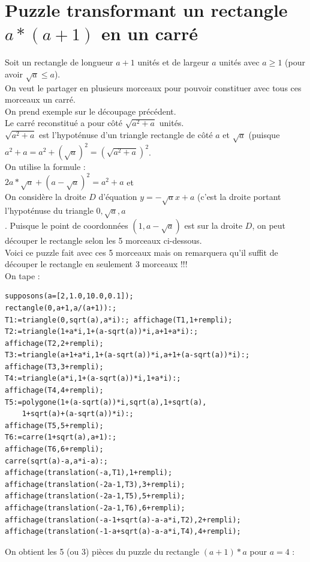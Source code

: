 \documentclass[a4paper,11pt]{book}
\begin{document}
\section{Puzzle transformant un rectangle $a*(a+1)$ en un carr\'e}
Soit un rectangle de longueur $a+1$ unit\'es et de largeur $a$ unit\'es avec 
$a\geq 1$ (pour avoir $\sqrt a \leq a$).\\
On veut le partager en plusieurs morceaux pour pouvoir constituer avec 
tous ces morceaux un carr\'e.\\
On prend exemple sur le d\'ecoupage pr\'ec\'edent.\\
Le carr\'e reconstitu\'e a pour c\^ot\'e $\sqrt{a^2+a}$ unit\'es.\\
$\sqrt{a^2+a}$ est l'hypot\'enuse d'un triangle rectangle de c\^ot\'e $a$ et 
$\sqrt a$ (puisque $a^2+a=a^2+(\sqrt a)^2=(\sqrt {a^2+a})^2$.\\
On utilise la formule :\\
$2a*\sqrt a+(a-\sqrt a)^2=a^2+a$ et\\
On consid\`ere la droite $D$ d'\'equation $y=-\sqrt ax+a$ (c'est la droite
portant l'hypot\'enuse du triangle $0,\sqrt a,a$\\.
Puisque le point de coordonn\'ees $(1,a-\sqrt a)$ est sur la droite $D$, on 
peut d\'ecouper le rectangle selon les 5 morceaux ci-dessous.\\
Voici ce puzzle fait avec ces 5 morceaux mais on remarquera qu'il suffit de 
d\'ecouper le rectangle en seulement 3 morceaux !!!\\
On tape :
\begin{verbatim}
supposons(a=[2,1.0,10.0,0.1]);
rectangle(0,a+1,a/(a+1)):;
T1:=triangle(0,sqrt(a),a*i):; affichage(T1,1+rempli);
T2:=triangle(1+a*i,1+(a-sqrt(a))*i,a+1+a*i):; 
affichage(T2,2+rempli);
T3:=triangle(a+1+a*i,1+(a-sqrt(a))*i,a+1+(a-sqrt(a))*i):; 
affichage(T3,3+rempli);
T4:=triangle(a*i,1+(a-sqrt(a))*i,1+a*i):; 
affichage(T4,4+rempli);
T5:=polygone(1+(a-sqrt(a))*i,sqrt(a),1+sqrt(a),
    1+sqrt(a)+(a-sqrt(a))*i):; 
affichage(T5,5+rempli);
T6:=carre(1+sqrt(a),a+1):;
affichage(T6,6+rempli);
carre(sqrt(a)-a,a*i-a):;
affichage(translation(-a,T1),1+rempli);
affichage(translation(-2a-1,T3),3+rempli);
affichage(translation(-2a-1,T5),5+rempli);
affichage(translation(-2a-1,T6),6+rempli);
affichage(translation(-a-1+sqrt(a)-a-a*i,T2),2+rempli);
affichage(translation(-1-a+sqrt(a)-a-a*i,T4),4+rempli);
\end{verbatim}
On obtient les 5 (ou 3) pi\`eces du puzzle du rectangle $(a+1)*a$ pour $a=4$ :\\
\end{document}
